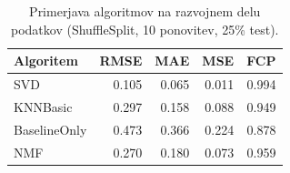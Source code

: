 \begin{table}[h]
\centering
\caption{Primerjava algoritmov na razvojnem delu podatkov (ShuffleSplit, 10 ponovitev, 25\% test).}
\label{tab:algorithm_comparison}
\begin{tabular}{lrrrr}
\toprule
Algoritem & RMSE & MAE & MSE & FCP \\
\midrule
SVD & 0.105 & 0.065 & 0.011 & 0.994 \\
KNNBasic & 0.297 & 0.158 & 0.088 & 0.949 \\
BaselineOnly & 0.473 & 0.366 & 0.224 & 0.878 \\
NMF & 0.270 & 0.180 & 0.073 & 0.959 \\
\bottomrule
\end{tabular}

\end{table}
